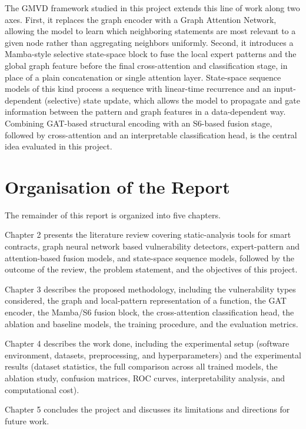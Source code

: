 \documentclass[12pt, a4paper, openright, twoside]{report}
\begin{document}
The GMVD framework studied in this project extends this line of work along two axes. First, it replaces the graph encoder with a Graph Attention Network, allowing the model to learn which neighboring statements are most relevant to a given node rather than aggregating neighbors uniformly. Second, it introduces a Mamba-style selective state-space block to fuse the local expert patterns and the global graph feature before the final cross-attention and classification stage, in place of a plain concatenation or single attention layer. State-space sequence models of this kind process a sequence with linear-time recurrence and an input-dependent (selective) state update, which allows the model to propagate and gate information between the pattern and graph features in a data-dependent way. Combining GAT-based structural encoding with an S6-based fusion stage, followed by cross-attention and an interpretable classification head, is the central idea evaluated in this project.

\section{Organisation of the Report}

The remainder of this report is organized into five chapters.

Chapter 2 presents the literature review covering static-analysis tools for smart contracts, graph neural network based vulnerability detectors, expert-pattern and attention-based fusion models, and state-space sequence models, followed by the outcome of the review, the problem statement, and the objectives of this project.

Chapter 3 describes the proposed methodology, including the vulnerability types considered, the graph and local-pattern representation of a function, the GAT encoder, the Mamba/S6 fusion block, the cross-attention classification head, the ablation and baseline models, the training procedure, and the evaluation metrics.

Chapter 4 describes the work done, including the experimental setup (software environment, datasets, preprocessing, and hyperparameters) and the experimental results (dataset statistics, the full comparison across all trained models, the ablation study, confusion matrices, ROC curves, interpretability analysis, and computational cost).

Chapter 5 concludes the project and discusses its limitations and directions for future work.
\end{document}
